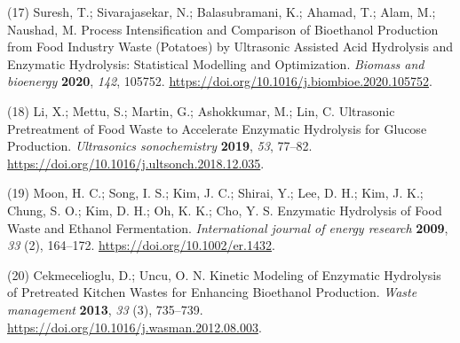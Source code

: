 \documentclass[11pt]{article}
\begin{document}
\hypertarget{citeproc_bib_item_17}{(17) Suresh, T.; Sivarajasekar, N.; Balasubramani, K.; Ahamad, T.; Alam, M.; Naushad, M. Process Intensification and Comparison of Bioethanol Production from Food Industry Waste (Potatoes) by Ultrasonic Assisted Acid Hydrolysis and Enzymatic Hydrolysis: Statistical Modelling and Optimization. \textit{Biomass and bioenergy} \textbf{2020}, \textit{142}, 105752. \url{https://doi.org/10.1016/j.biombioe.2020.105752}.}

\hypertarget{citeproc_bib_item_18}{(18) Li, X.; Mettu, S.; Martin, G.; Ashokkumar, M.; Lin, C. Ultrasonic Pretreatment of Food Waste to Accelerate Enzymatic Hydrolysis for Glucose Production. \textit{Ultrasonics sonochemistry} \textbf{2019}, \textit{53}, 77–82. \url{https://doi.org/10.1016/j.ultsonch.2018.12.035}.}

\hypertarget{citeproc_bib_item_19}{(19) Moon, H. C.; Song, I. S.; Kim, J. C.; Shirai, Y.; Lee, D. H.; Kim, J. K.; Chung, S. O.; Kim, D. H.; Oh, K. K.; Cho, Y. S. Enzymatic Hydrolysis of Food Waste and Ethanol Fermentation. \textit{International journal of energy research} \textbf{2009}, \textit{33} (2), 164–172. \url{https://doi.org/10.1002/er.1432}.}

\hypertarget{citeproc_bib_item_20}{(20) Cekmecelioglu, D.; Uncu, O. N. Kinetic Modeling of Enzymatic Hydrolysis of Pretreated Kitchen Wastes for Enhancing Bioethanol Production. \textit{Waste management} \textbf{2013}, \textit{33} (3), 735–739. \url{https://doi.org/10.1016/j.wasman.2012.08.003}.}\bigskip
\end{document}
